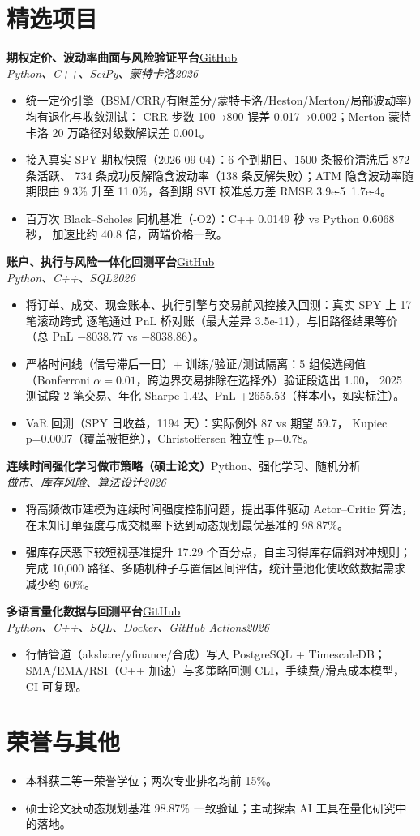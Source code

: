 \documentclass[a4paper,10pt]{ctexart}
\newcommand{\entry}[4]{\textbf{#1}\hfill #2\\ \textit{#3}\hfill \textit{#4}\\[-4pt]}
\begin{document}
\section{精选项目}
\entry{期权定价、波动率曲面与风险验证平台}
{\href{https://github.com/burger56487/options-volatility-backtester}{GitHub}}
{Python、C++、SciPy、蒙特卡洛}{2026}
\begin{itemize}
\item 统一定价引擎（BSM/CRR/有限差分/蒙特卡洛/Heston/Merton/局部波动率）均有退化与收敛测试：
CRR 步数 100→800 误差 0.017→0.002；Merton 蒙特卡洛 20 万路径对级数解误差 0.001。
\item 接入真实 SPY 期权快照（2026-09-04）：6 个到期日、1500 条报价清洗后 872 条活跃、
734 条成功反解隐含波动率（138 条反解失败）；ATM 隐含波动率随期限由 9.3\% 升至
11.0\%，各到期 SVI 校准总方差 RMSE 3.9e-5~1.7e-4。
\item 百万次 Black--Scholes 同机基准（-O2）：C++ 0.0149 秒 vs Python 0.6068 秒，
加速比约 40.8 倍，两端价格一致。
\end{itemize}
\entry{账户、执行与风险一体化回测平台}
{\href{https://github.com/burger56487/options-volatility-backtester}{GitHub}}
{Python、C++、SQL}{2026}
\begin{itemize}
\item 将订单、成交、现金账本、执行引擎与交易前风控接入回测：真实 SPY 上 17 笔滚动跨式
逐笔通过 PnL 桥对账（最大差异 3.5e-11），与旧路径结果等价（总 PnL −8038.77 vs −8038.86）。
\item 严格时间线（信号滞后一日）+ 训练/验证/测试隔离：5 组候选阈值
（Bonferroni $\alpha=0.01$，跨边界交易排除在选择外）验证段选出 1.00，
2025 测试段 2 笔交易、年化 Sharpe 1.42、PnL +2655.53（样本小，如实标注）。
\item VaR 回测（SPY 日收益，1194 天）：实际例外 87 vs 期望 59.7，
Kupiec p=0.0007（覆盖被拒绝），Christoffersen 独立性 p=0.78。
\end{itemize}
\entry{连续时间强化学习做市策略（硕士论文）}
{Python、强化学习、随机分析}{做市、库存风险、算法设计}{2026}
\begin{itemize}
\item 将高频做市建模为连续时间强度控制问题，提出事件驱动 Actor--Critic 算法，
在未知订单强度与成交概率下达到动态规划最优基准的 98.87\%。
\item 强库存厌恶下较短视基准提升 17.29 个百分点，自主习得库存偏斜对冲规则；
完成 10,000 路径、多随机种子与置信区间评估，统计量池化使收敛数据需求减少约 60\%。
\end{itemize}
\entry{多语言量化数据与回测平台}
{\href{https://github.com/burger56487/quant-platform}{GitHub}}
{Python、C++、SQL、Docker、GitHub Actions}{2026}
\begin{itemize}
\item 行情管道（akshare/yfinance/合成）写入 PostgreSQL + TimescaleDB；
SMA/EMA/RSI（C++ 加速）与多策略回测 CLI，手续费/滑点成本模型，CI 可复现。
\end{itemize}

\section{荣誉与其他}
\begin{itemize}
\item 本科获二等一荣誉学位；两次专业排名均前 15\%。
\item 硕士论文获动态规划基准 98.87\% 一致验证；主动探索 AI 工具在量化研究中的落地。
\end{itemize}
\end{document}
